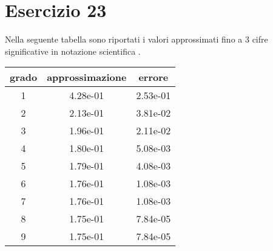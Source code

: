 \section{Esercizio 23}


Nella seguente tabella sono riportati i valori approssimati fino a 3 cifre significative in notazione scientifica .
\begin{table}[ht]
	\centering
	\small
	\begin{tabular}{| c| c | c|}
	\hline
	grado & approssimazione& errore\\
	\hline
	1 & 4.28e-01 & 2.53e-01\\
	\hline
	2 &2.13e-01&3.81e-02\\
	\hline
	3 & 1.96e-01 & 2.11e-02\\
	\hline
	4 & 1.80e-01 &5.08e-03\\
	\hline
	5 & 1.79e-01&4.08e-03  \\
	\hline
	6 &1.76e-01&1.08e-03 \\
	\hline
	7 & 1.76e-01 & 1.08e-03\\
	\hline
	8 & 1.75e-01 &  7.84e-05\\
	\hline
	9 & 1.75e-01  &7.84e-05\\
	\hline
	\end{tabular}
\end{table}